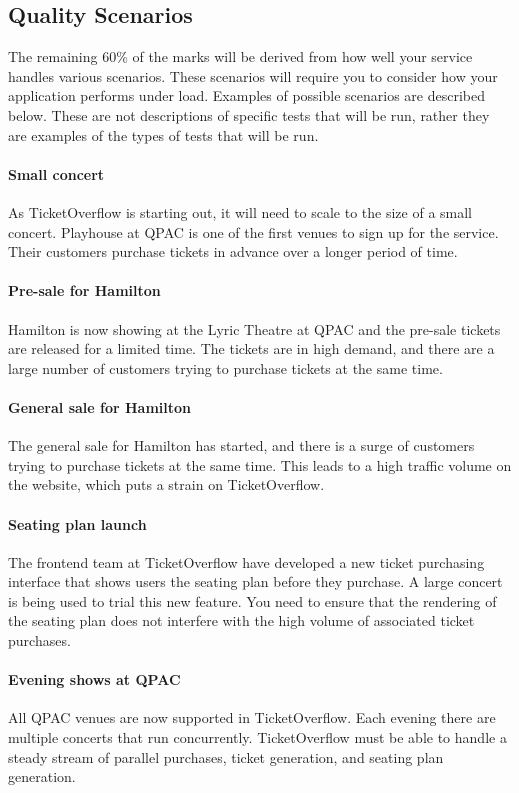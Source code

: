 \documentclass{csse4400}
\begin{document}
\subsection{Quality Scenarios}\label{sec:scenarios}
The remaining 60\% of the marks will be derived from how well your service handles various scenarios.
These scenarios will require you to consider how your application performs under load.
Examples of possible scenarios are described below.
These are not descriptions of specific tests that will be run,
rather they are examples of the types of tests that will be run.

\paragraph{Small concert}
As TicketOverflow is starting out,
it will need to scale to the size of a small concert.
Playhouse at QPAC is one of the first venues to sign up for the service.
Their customers purchase tickets in advance over a longer period of time.

\paragraph{Pre-sale for Hamilton}
Hamilton is now showing at the Lyric Theatre at QPAC and the pre-sale tickets are released for a limited time.
The tickets are in high demand, and there are a large number of customers trying to purchase tickets at the same time.

\paragraph{General sale for Hamilton}
The general sale for Hamilton has started, and there is a surge of customers trying to purchase tickets at the same time.
This leads to a high traffic volume on the website, which puts a strain on TicketOverflow.

\paragraph{Seating plan launch}
The frontend team at TicketOverflow have developed a new ticket purchasing interface that shows users the seating plan before they purchase.
A large concert is being used to trial this new feature.
You need to ensure that the rendering of the seating plan does not interfere with the high volume of associated ticket purchases.

\paragraph{Evening shows at QPAC}
All QPAC venues are now supported in TicketOverflow.
Each evening there are multiple concerts that run concurrently.
TicketOverflow must be able to handle a steady stream of parallel purchases, ticket generation, and seating plan generation.
\end{document}
